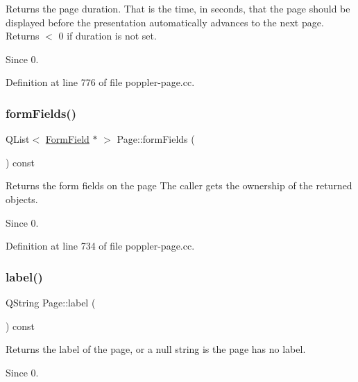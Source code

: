 Returns the page duration. That is the time, in seconds, that the page should be displayed before the presentation automatically advances to the next page. Returns $<$ 0 if duration is not set.

\begin{DoxySince}{Since}
0. 
\end{DoxySince}


Definition at line 776 of file poppler-\/page.\+cc.

\mbox{\label{class_poppler_1_1_page_aa7073bd787eb01617a2b530557397a59}} 
\subsubsection{\texorpdfstring{form\+Fields()}{formFields()}}
{\footnotesize\ttfamily Q\+List$<$ \hyperlink{class_poppler_1_1_form_field}{Form\+Field} $\ast$ $>$ Page\+::form\+Fields (\begin{DoxyParamCaption}{ }\end{DoxyParamCaption}) const}

Returns the form fields on the page The caller gets the ownership of the returned objects.

\begin{DoxySince}{Since}
0. 
\end{DoxySince}


Definition at line 734 of file poppler-\/page.\+cc.

\mbox{\label{class_poppler_1_1_page_a7592a930424ad1e9a98565afb8cd61bf}} 
\subsubsection{\texorpdfstring{label()}{label()}}
{\footnotesize\ttfamily Q\+String Page\+::label (\begin{DoxyParamCaption}{ }\end{DoxyParamCaption}) const}

Returns the label of the page, or a null string is the page has no label.

\begin{DoxySince}{Since}
0. 
\end{DoxySince}


